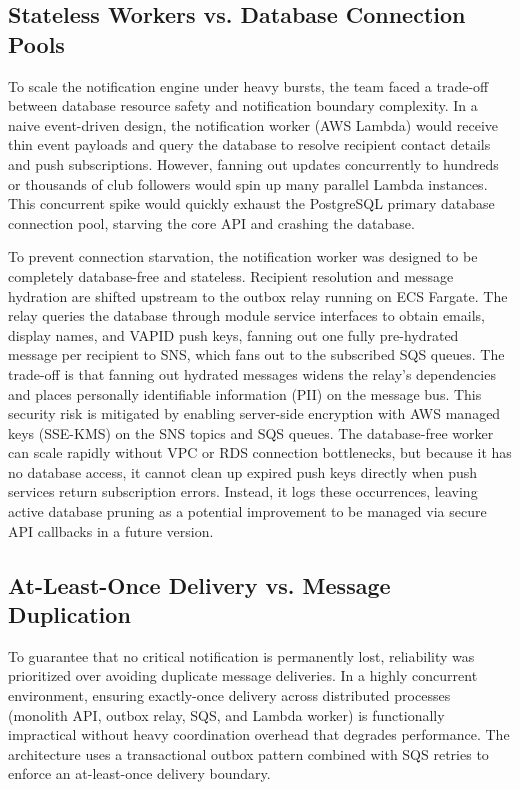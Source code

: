 \subsection{Stateless Workers vs. Database Connection Pools}
To scale the notification engine under heavy bursts, the team faced a trade-off between database resource safety and notification boundary complexity. In a naive event-driven design, the notification worker (AWS Lambda) would receive thin event payloads and query the database to resolve recipient contact details and push subscriptions. However, fanning out updates concurrently to hundreds or thousands of club followers would spin up many parallel Lambda instances. This concurrent spike would quickly exhaust the PostgreSQL primary database connection pool, starving the core API and crashing the database.

To prevent connection starvation, the notification worker was designed to be completely database-free and stateless. Recipient resolution and message hydration are shifted upstream to the outbox relay running on ECS Fargate. The relay queries the database through module service interfaces to obtain emails, display names, and VAPID push keys, fanning out one fully pre-hydrated message per recipient to SNS, which fans out to the subscribed SQS queues. The trade-off is that fanning out hydrated messages widens the relay's dependencies and places personally identifiable information (PII) on the message bus. This security risk is mitigated by enabling server-side encryption with AWS managed keys (SSE-KMS) on the SNS topics and SQS queues. The database-free worker can scale rapidly without VPC or RDS connection bottlenecks, but because it has no database access, it cannot clean up expired push keys directly when push services return subscription errors. Instead, it logs these occurrences, leaving active database pruning as a potential improvement to be managed via secure API callbacks in a future version.

\subsection{At-Least-Once Delivery vs. Message Duplication}
To guarantee that no critical notification is permanently lost, reliability was prioritized over avoiding duplicate message deliveries. In a highly concurrent environment, ensuring exactly-once delivery across distributed processes (monolith API, outbox relay, SQS, and Lambda worker) is functionally impractical without heavy coordination overhead that degrades performance. The architecture uses a transactional outbox pattern combined with SQS retries to enforce an at-least-once delivery boundary.

